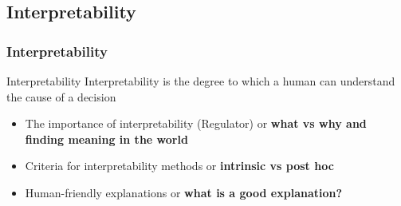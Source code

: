 \documentclass{beamer}\usepackage[]{graphicx}\usepackage[]{color}
\begin{document}
%
\subsection{Interpretability} %

\begin{frame}[fragile]
\frametitle{Interpretability\footnotemark[1]}
\begin{block}{Interpretability}
Interpretability is the degree to which a human can understand the cause of a decision\footnotemark[2]
\end{block}
\begin{itemize}
\item The importance of interpretability (Regulator) or \textbf{what vs why and finding meaning in the world}
\item Criteria for interpretability methods or \textbf{intrinsic vs post hoc}
\item Human-friendly explanations or \textbf{what is a good explanation?}
\end{itemize}
\end{frame}
\end{document}
